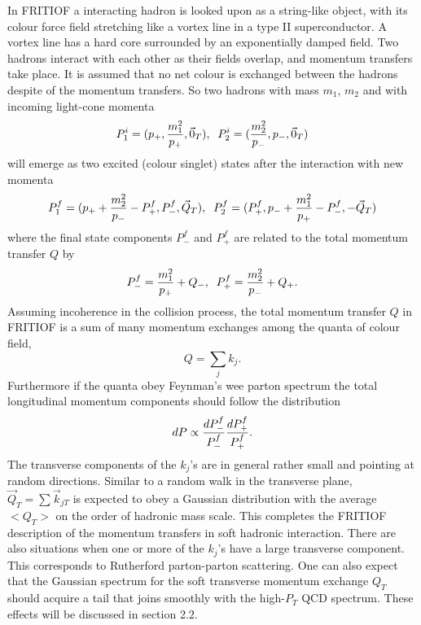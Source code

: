 In FRITIOF a interacting hadron is looked upon as a string-like object,
with its colour force field stretching like a vortex line in a type II superconductor.  A vortex line has a hard core surrounded by an exponentially
damped field.  Two hadrons interact with each other as their fields overlap,
and momentum transfers take place.  It is assumed that no net colour is
exchanged between the hadrons despite of the momentum transfers.  So two hadrons
with mass $m_1$, $m_2$ and with incoming light-cone momenta
\begin{equation}
\label{pini}
 P_1^i = (p_+, {m_1^2\over p_+}, \vec{0}_T),\;\;
 P_2^i = ({m_2^2\over p_-}, p_-, \vec{0}_T)
\end{equation}
will emerge as two excited (colour singlet) states after the interaction with new momenta
\begin{equation}
\label{pfin}
 P_1^f = (p_++{m_2^2\over p_-}-P_+^f, P_-^f, \vec{Q}_T),\;\;
 P_2^f = (P_+^f, p_-+{m_1^2\over p_+}-P_-^f, -\vec{Q}_T)
\end{equation}
where the final state components $P_-^f$ and $P_+^f$ are related to the
total momentum transfer $Q$ by
\begin{equation}
\label{pfinq}
 P_-^f = {m_1^2\over p_+} + Q_-,\;\;
 P_+^f = {m_2^2\over p_-} + Q_+.
\end{equation}
Assuming incoherence in the collision process, the total momentum transfer $Q$ in FRITIOF is a sum of many momentum exchanges among the quanta of colour field, 
\begin{equation}
\label{qkj}
Q=\sum_j k_j.    
\end{equation}
Furthermore if the quanta  
obey Feynman's wee parton spectrum the total longitudinal momentum
components should follow the distribution
\begin{equation}
\label{pdist}
 dP \propto {dP_-^f\over P_-^f} {dP_+^f\over P_+^f}.
\end{equation}
The transverse components of the $k_j$'s are in general rather small and pointing
at random directions.  Similar to a random walk in the 
transverse plane, $\vec{Q}_T=\sum \vec{k}_{jT}$ is expected to obey a
Gaussian distribution with the average $<Q_T>$ on the order of hadronic mass  scale.  This completes the FRITIOF description of the momentum transfers in soft hadronic
interaction.  There are also situations when one or more of the
$k_j$'s have a large transverse component.  This corresponds to Rutherford  parton-parton scattering.   
One can also expect that the Gaussian spectrum for the
soft transverse momentum exchange $Q_T$ should acquire a tail that joins smoothly
with the high-$P_T$ QCD spectrum.  These effects will be discussed 
in section 2.2. 

